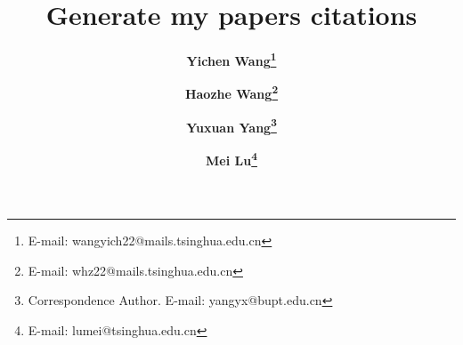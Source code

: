\documentclass[12pt]{article}%
\begin{document}

\title{Generate my papers citations}


\author[1]{\small\bf Yichen Wang\thanks{E-mail:  wangyich22@mails.tsinghua.edu.cn}}
\author[1]{\small\bf Haozhe Wang\thanks{E-mail:  whz22@mails.tsinghua.edu.cn}}
\author[2]{\small\bf Yuxuan Yang\thanks{Correspondence Author. E-mail:  yangyx@bupt.edu.cn}}
\author[1]{\small\bf Mei Lu\thanks{E-mail:  lumei@tsinghua.edu.cn}}





\date{}

\maketitle
\end{document}
